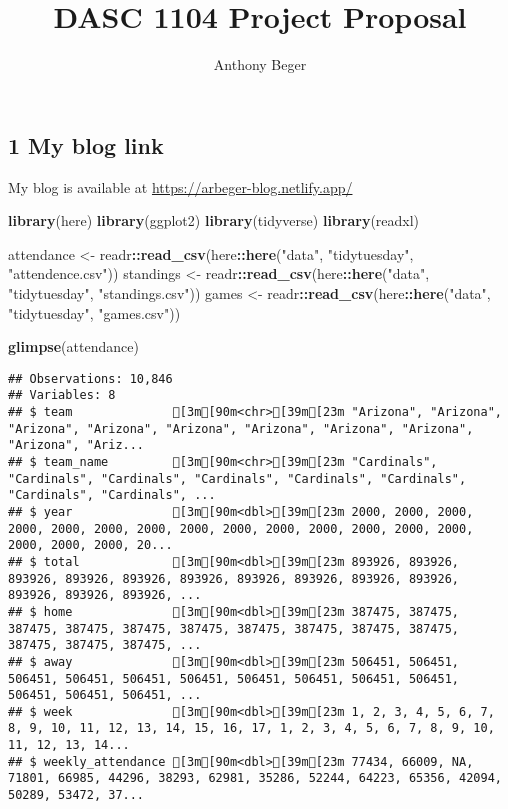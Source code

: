 \documentclass[
]{article}
\title{DASC 1104 Project Proposal}
\author{Anthony Beger}
\date{}
\newenvironment{Shaded}{\begin{snugshade}}{\end{snugshade}}
\newcommand{\KeywordTok}[1]{\textcolor[rgb]{0.13,0.29,0.53}{\textbf{#1}}}
\newcommand{\NormalTok}[1]{#1}
\newcommand{\OperatorTok}[1]{\textcolor[rgb]{0.81,0.36,0.00}{\textbf{#1}}}
\newcommand{\StringTok}[1]{\textcolor[rgb]{0.31,0.60,0.02}{#1}}
\begin{document}
\maketitle

\hypertarget{my-blog-link}{%
\subsection{1 My blog link}\label{my-blog-link}}

My blog is available at \url{https://arbeger-blog.netlify.app/}

\begin{Shaded}
\begin{Highlighting}[]
\KeywordTok{library}\NormalTok{(here)}
\KeywordTok{library}\NormalTok{(ggplot2)}
\KeywordTok{library}\NormalTok{(tidyverse)}
\KeywordTok{library}\NormalTok{(readxl)}

\NormalTok{attendance <-}\StringTok{ }\NormalTok{readr}\OperatorTok{::}\KeywordTok{read_csv}\NormalTok{(here}\OperatorTok{::}\KeywordTok{here}\NormalTok{(}\StringTok{"data"}\NormalTok{, }\StringTok{"tidytuesday"}\NormalTok{, }\StringTok{"attendence.csv"}\NormalTok{))}
\NormalTok{standings <-}\StringTok{ }\NormalTok{readr}\OperatorTok{::}\KeywordTok{read_csv}\NormalTok{(here}\OperatorTok{::}\KeywordTok{here}\NormalTok{(}\StringTok{"data"}\NormalTok{, }\StringTok{"tidytuesday"}\NormalTok{, }\StringTok{"standings.csv"}\NormalTok{))}
\NormalTok{games <-}\StringTok{ }\NormalTok{readr}\OperatorTok{::}\KeywordTok{read_csv}\NormalTok{(here}\OperatorTok{::}\KeywordTok{here}\NormalTok{(}\StringTok{"data"}\NormalTok{, }\StringTok{"tidytuesday"}\NormalTok{, }\StringTok{"games.csv"}\NormalTok{))}

\KeywordTok{glimpse}\NormalTok{(attendance)}
\end{Highlighting}
\end{Shaded}

\begin{verbatim}
## Observations: 10,846
## Variables: 8
## $ team              [3m[90m<chr>[39m[23m "Arizona", "Arizona", "Arizona", "Arizona", "Arizona", "Arizona", "Arizona", "Arizona", "Arizona", "Ariz...
## $ team_name         [3m[90m<chr>[39m[23m "Cardinals", "Cardinals", "Cardinals", "Cardinals", "Cardinals", "Cardinals", "Cardinals", "Cardinals", ...
## $ year              [3m[90m<dbl>[39m[23m 2000, 2000, 2000, 2000, 2000, 2000, 2000, 2000, 2000, 2000, 2000, 2000, 2000, 2000, 2000, 2000, 2000, 20...
## $ total             [3m[90m<dbl>[39m[23m 893926, 893926, 893926, 893926, 893926, 893926, 893926, 893926, 893926, 893926, 893926, 893926, 893926, ...
## $ home              [3m[90m<dbl>[39m[23m 387475, 387475, 387475, 387475, 387475, 387475, 387475, 387475, 387475, 387475, 387475, 387475, 387475, ...
## $ away              [3m[90m<dbl>[39m[23m 506451, 506451, 506451, 506451, 506451, 506451, 506451, 506451, 506451, 506451, 506451, 506451, 506451, ...
## $ week              [3m[90m<dbl>[39m[23m 1, 2, 3, 4, 5, 6, 7, 8, 9, 10, 11, 12, 13, 14, 15, 16, 17, 1, 2, 3, 4, 5, 6, 7, 8, 9, 10, 11, 12, 13, 14...
## $ weekly_attendance [3m[90m<dbl>[39m[23m 77434, 66009, NA, 71801, 66985, 44296, 38293, 62981, 35286, 52244, 64223, 65356, 42094, 50289, 53472, 37...
\end{verbatim}
\end{document}
